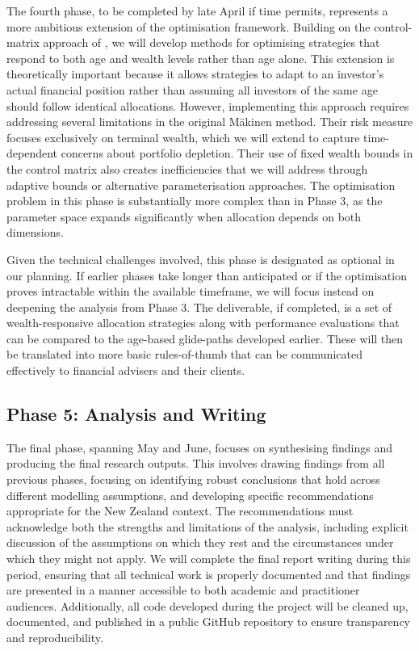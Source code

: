 \documentclass[11pt]{article}
\begin{document}
The fourth phase, to be completed by late April if time permits, represents a more ambitious extension of the optimisation framework. Building on the control-matrix approach of \textcite{Makinen2024}, we will develop methods for optimising strategies that respond to both age and wealth levels rather than age alone. This extension is theoretically important because it allows strategies to adapt to an investor's actual financial position rather than assuming all investors of the same age should follow identical allocations. However, implementing this approach requires addressing several limitations in the original Mäkinen method. Their risk measure focuses exclusively on terminal wealth, which we will extend to capture time-dependent concerns about portfolio depletion. Their use of fixed wealth bounds in the control matrix also creates inefficiencies that we will address through adaptive bounds or alternative parameterisation approaches. The optimisation problem in this phase is substantially more complex than in Phase 3, as the parameter space expands significantly when allocation depends on both dimensions.

Given the technical challenges involved, this phase is designated as optional in our planning. If earlier phases take longer than anticipated or if the optimisation proves intractable within the available timeframe, we will focus instead on deepening the analysis from Phase 3. The deliverable, if completed, is a set of wealth-responsive allocation strategies along with performance evaluations that can be compared to the age-based glide-paths developed earlier. These will then be translated into more basic rules-of-thumb that can be communicated effectively to financial advisers and their clients.

\subsection{Phase 5: Analysis and Writing}

The final phase, spanning May and June, focuses on synthesising findings and producing the final research outputs. This involves drawing findings from all previous phases, focusing on identifying robust conclusions that hold across different modelling assumptions, and developing specific recommendations appropriate for the New Zealand context. The recommendations must acknowledge both the strengths and limitations of the analysis, including explicit discussion of the assumptions on which they rest and the circumstances under which they might not apply. We will complete the final report writing during this period, ensuring that all technical work is properly documented and that findings are presented in a manner accessible to both academic and practitioner audiences. Additionally, all code developed during the project will be cleaned up, documented, and published in a public GitHub repository to ensure transparency and reproducibility.
\end{document}
